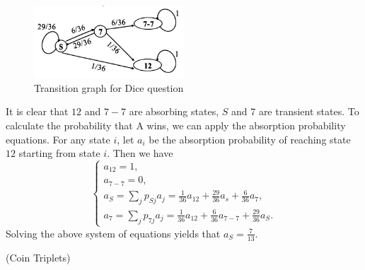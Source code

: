 \documentclass[12pt,letterpaper, onecolumn]{exam}
\begin{document}
\begin{questions}
\begin{solution}
            \begin{figure}[H]
                \centering
                \includegraphics[width=0.5\textwidth]{figures/fig-4.png} %
                \caption{Transition graph for Dice question}
            \end{figure}
            \quad It is clear that $12$ and $7-7$ are absorbing states, $S$ and $7$ are transient states. To calculate the probability that A wins, we can apply the absorption probability equations. For any state $i$, let $a_i$ be the absorption probability of reaching state $12$ starting from state $i$. Then we have
            \begin{equation*}
                \begin{cases}
                    a_{12}=1,\\
                    a_{7-7}=0,\\
                    a_S=\sum\limits_{j}p_{Sj}a_j=\frac{1}{36}a_{12}+\frac{29}{36}a_{s}+\frac{6}{36}a_{7},\\
                    a_7=\sum\limits_{j}p_{7j}a_j=\frac{1}{36}a_{12}+\frac{6}{36}a_{7-7}+\frac{29}{36}a_{S}.
                \end{cases}
            \end{equation*}
            Solving the above system of equations yields that $a_S=\frac{7}{13}$.
        \end{solution}
        \question[](Coin Triplets)
\end{questions}
\end{document}
